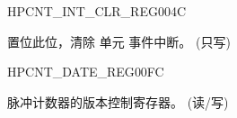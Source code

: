 \begin{register}{H}{PCNT\_INT\_CLR\_REG}{\hexprefix{}004C}\label{regdesc:PCNTINTCLRREG}
%
%
%
%
%
\regnewline%
\begin{regdesc}\begin{reglist}
\label{fielddesc:PCNTCNTTHREVENTUNINTCLR}\item [PCNT\_CNT\_THR\_EVENT\_U\regindex{n}\_INT\_CLR] 置位此位，清除 单元  事件中断。 (只写)
\end{reglist}\end{regdesc}
\end{register}


\begin{register}{H}{PCNT\_DATE\_REG}{\hexprefix{}00FC}\label{regdesc:PCNTDATEREG}
%
\regnewline%
\begin{regdesc}\begin{reglist}
\label{fielddesc:PCNTDATE}\item [PCNT\_DATE] 脉冲计数器的版本控制寄存器。 (读/写)
\end{reglist}\end{regdesc}
\end{register}


